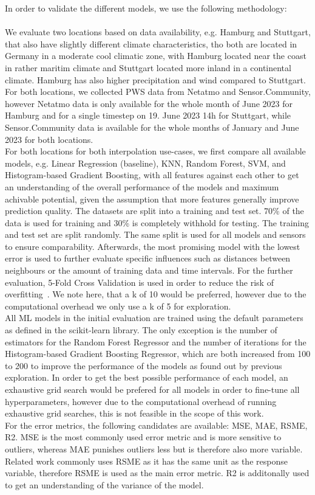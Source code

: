 In order to validate the different models, we use the following methodology:\\
\\
We evaluate two locations based on data availability, e.g. Hamburg and Stuttgart, that also have slightly different climate characteristics, tho both are located in Germany in a moderate cool climatic zone, with Hamburg located near the coast in rather maritim climate and Stuttgart located more inland in a continental climate. Hamburg has also higher precipitation and wind compared to Stuttgart.
For both locations, we collected PWS data from Netatmo and Sensor.Community, however Netatmo data is only available for the whole month of June 2023 for Hamburg and for a single timestep on 19. June 2023 14h for Stuttgart, while Sensor.Community data is available for the whole months of January and June 2023 for both locations.\\
For both locations for both interpolation use-cases, we first compare all available models, e.g. Linear Regression (baseline), KNN, Random Forest, SVM, and Histogram-based Gradient Boosting, with all features against each other to get an understanding of the overall performance of the models and maximum achivable potential, given the assumption that more features generally improve prediction quality. The datasets are split into a training and test set. 70\% of the data is used for training and 30\% is completely withhold for testing. The training and test set are split randomly. The same split is used for all models and sensors to ensure comparability.
Afterwards, the most promising model with the lowest error is used to further evaluate specific influences such as distances between neighbours or the amount of training data and time intervals. For the further evaluation, 5-Fold Cross Validation is used in order to reduce the risk of overfitting~\cite{kohavi1995study}. We note here, that a k of 10 would be preferred, however due to the computational overhead we only use a k of 5 for exploration.\\
All ML models in the initial evaluation are trained using the default parameters as defined in the scikit-learn library. The only exception is the number of estimators for the Random Forest Regressor and the number of iterations for the Histogram-based Gradient Boosting Regressor, which are both increased from 100 to 200 to improve the performance of the models as found out by previous exploration. In order to get the best possible performance of each model, an exhaustive grid search would be prefered for all models in order to fine-tune all hyperparameters, however due to the computational overhead of running exhaustive grid searches, this is not feasible in the scope of this work.\\
For the error metrics, the following candidates are available: MSE, MAE, RSME, R2. MSE is the most commonly used error metric and is more sensitive to outliers, whereas MAE punishes outliers less but is therefore also more variable. Related work commonly uses RSME as it has the same unit as the response variable, therefore RSME is used as the main error metric. R2 is additonally used to get an understanding of the variance of the model.

